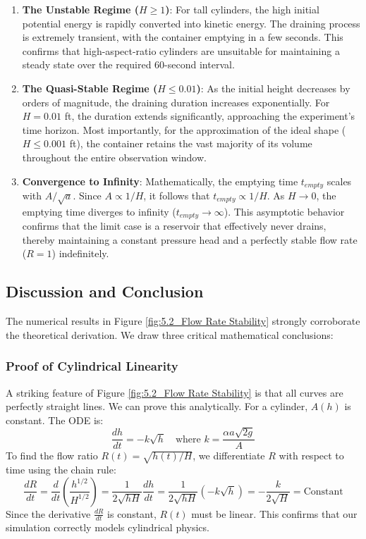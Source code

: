 \documentclass[a4paper, 12pt]{article}
\begin{document}
\begin{enumerate}
    \item \textbf{The Unstable Regime ($H \ge 1$)}: 
    For tall cylinders, the high initial potential energy is rapidly converted into kinetic energy. The draining process is extremely transient, with the container emptying in a few seconds. This confirms that high-aspect-ratio cylinders are unsuitable for maintaining a steady state over the required 60-second interval.

    \item \textbf{The Quasi-Stable Regime ($H \le 0.01$)}: 
    As the initial height decreases by orders of magnitude, the draining duration increases exponentially. For $H=0.01$ ft, the duration extends significantly, approaching the experiment's time horizon. Most importantly, for the approximation of the ideal shape ($H \le 0.001$ ft), the container retains the vast majority of its volume throughout the entire observation window.
    
    \item \textbf{Convergence to Infinity}: 
    Mathematically, the emptying time $t_{empty}$ scales with $A/\sqrt{a}$. Since $A \propto 1/H$, it follows that $t_{empty} \propto 1/H$. As $H \to 0$, the emptying time diverges to infinity ($t_{empty} \to \infty$). This asymptotic behavior confirms that the limit case is a reservoir that effectively never drains, thereby maintaining a constant pressure head and a perfectly stable flow rate ($R=1$) indefinitely.
\end{enumerate}

\subsection{Discussion and Conclusion}

The numerical results in Figure \ref{fig:5.2_Flow Rate Stability} strongly corroborate the theoretical derivation. We draw three critical mathematical conclusions:

\subsubsection{Proof of Cylindrical Linearity}
A striking feature of Figure \ref{fig:5.2_Flow Rate Stability} is that all curves are perfectly straight lines. We can prove this analytically.
For a cylinder, $A(h)$ is constant. The ODE is:
\begin{equation}
    \frac{dh}{dt} = -k \sqrt{h} \quad \text{where } k = \frac{\alpha a \sqrt{2g}}{A}
\end{equation}
To find the flow ratio $R(t) = \sqrt{h(t)/H}$, we differentiate $R$ with respect to time using the chain rule:
\begin{equation}
    \frac{dR}{dt} = \frac{d}{dt}\left( \frac{h^{1/2}}{H^{1/2}} \right) = \frac{1}{2\sqrt{hH}} \frac{dh}{dt} = \frac{1}{2\sqrt{hH}} (-k\sqrt{h}) = -\frac{k}{2\sqrt{H}} = \text{Constant}
\end{equation}
Since the derivative $\frac{dR}{dt}$ is constant, $R(t)$ must be linear. This confirms that our simulation correctly models cylindrical physics.
\end{document}
